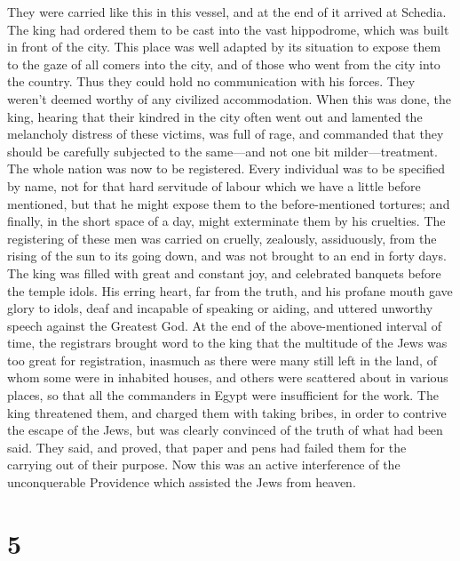  They were carried like this in this vessel, and at the end
of it arrived at Schedia. The king had ordered them to be cast into the
vast hippodrome, which was built in front of the city. This place was
well adapted by its situation to expose them to the gaze of all comers
into the city, and of those who went from the city into the country.
Thus they could hold no communication with his forces. They weren't
deemed worthy of any civilized accommodation.  When this
was done, the king, hearing that their kindred in the city often went
out and lamented the melancholy distress of these victims, 
was full of rage, and commanded that they should be carefully subjected
to the same---and not one bit milder---treatment.  The
whole nation was now to be registered. Every individual was to be
specified by name, not for that hard servitude of labour which we have a
little before mentioned, but that he might expose them to the
before-mentioned tortures; and finally, in the short space of a day,
might exterminate them by his cruelties.  The registering
of these men was carried on cruelly, zealously, assiduously, from the
rising of the sun to its going down, and was not brought to an end in
forty days.  The king was filled with great and constant
joy, and celebrated banquets before the temple idols. His erring heart,
far from the truth, and his profane mouth gave glory to idols, deaf and
incapable of speaking or aiding, and uttered unworthy speech against the
Greatest God.  At the end of the above-mentioned interval
of time, the registrars brought word to the king that the multitude of
the Jews was too great for registration,  inasmuch as there
were many still left in the land, of whom some were in inhabited houses,
and others were scattered about in various places, so that all the
commanders in Egypt were insufficient for the work.  The
king threatened them, and charged them with taking bribes, in order to
contrive the escape of the Jews, but was clearly convinced of the truth
of what had been said.  They said, and proved, that paper
and pens had failed them for the carrying out of their purpose.
 Now this was an active interference of the unconquerable
Providence which assisted the Jews from heaven.

\hypertarget{section-4}{%
\section{5}\label{section-4}}

